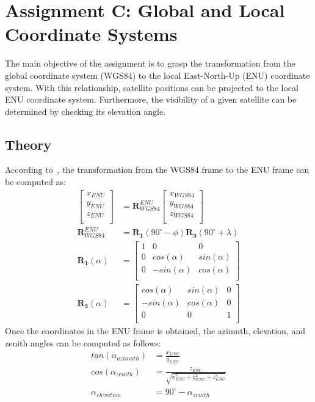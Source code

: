 \chapter{Assignment C: Global and Local Coordinate Systems}
The main objective of the assignment is to grasp the transformation from the global coordinate system (WGS84) to the local East-North-Up (ENU) coordinate system. With this relationship, satellite positions can be projected to the local ENU coordinate system. Furthermore, the visibility of a given satellite can be determined by checking its elevation angle.

\section{Theory}
According to~\cite{misra2006global}, the transformation from the WGS84 frame to the ENU frame can be computed as:
\begin{align}
\left[\begin{matrix}
x_{ENU} \\
y_{ENU} \\
z_{ENU} \\
\end{matrix}\right] &= \mathbf{R}_{WGS84}^{ENU}
\left[\begin{matrix}
x_{WGS84} \\
y_{WGS84} \\
z_{WGS84} \\
\end{matrix}\right] \\
\mathbf{R}_{WGS84}^{ENU} &= \mathbf{R_1}(90^{\circ}-\phi)\mathbf{R_3}(90^{\circ}+\lambda) \\
\mathbf{R_1}(\alpha) &= 
\left[\begin{matrix}
1 & 0 & 0 \\
0 & cos(\alpha) & sin(\alpha) \\
0 & -sin(\alpha) & cos(\alpha) \\
\end{matrix}\right]\\
\mathbf{R_3}(\alpha) &= 
\left[\begin{matrix}
cos(\alpha) & sin(\alpha) & 0 \\
-sin(\alpha) & cos(\alpha) & 0 \\
0 & 0 & 1 \\
\end{matrix}\right]
\end{align}
Once the coordinates in the ENU frame is obtained, the azimuth, elevation, and zenith angles can be computed as follows:
\begin{align}
tan(\alpha_{azimuth}) &= \frac{x_{ENU}}{y_{ENU}} \\
cos(\alpha_{zenith}) &= \frac{z_{ENU}}{\sqrt{x_{ENU}^2+y_{ENU}^2+z_{ENU}^2}} \\
\alpha_{elevation} &= 90^{\circ}-\alpha_{zenith}
\end{align}
